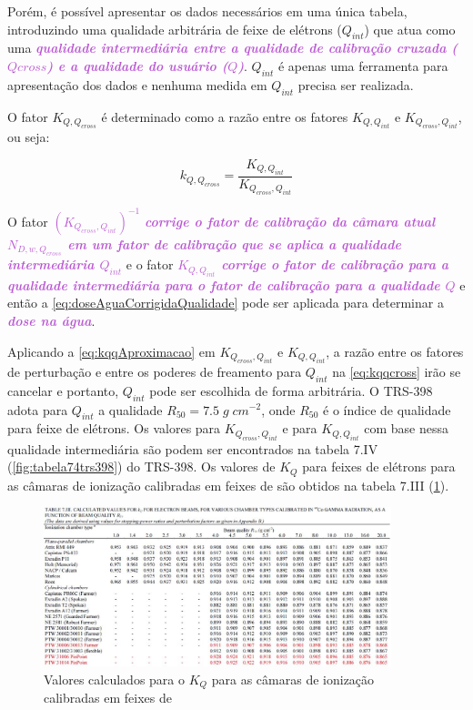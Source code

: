 \documentclass[11pt,a4paper]{article}
\begin{document}
		Porém, é possível apresentar os dados necessários em uma única tabela, introduzindo uma qualidade arbitrária de feixe de elétrons ($Q_{int}$) que atua como uma \textcolor{MediumOrchid}{\textit{\textbf{qualidade intermediária entre a qualidade de calibração cruzada ($Q{cross}$) e a qualidade do usuário ($Q$)}}}. $Q_{int}$ é apenas uma ferramenta para apresentação dos dados e nenhuma medida em $Q_{int}$ precisa ser realizada. 

		O fator $K_{Q,Q_{cross}}$ é determinado como a razão entre os fatores $K_{Q,Q_{int}}$ e $K_{Q_{cross},Q_{int}}$, ou seja:

			\begin{equation}
				k_{Q,Q_{cross}} = \frac{K_{Q,Q_{int}}}{K_{Q_{cross},Q_{int}}}
				\label{eq:kqqcross}
			\end{equation}

		O fator \textcolor{MediumOrchid}{\textit{\textbf{$(K_{Q_{cross},Q_{int}})^{-1}$}}} \textcolor{MediumOrchid}{\textit{\textbf{corrige o fator de calibração da câmara atual $N_{D,w,Q_{cross}}$ em um fator de calibração que se aplica a qualidade intermediária $Q_{int}$}}} e o fator \textcolor{MediumOrchid}{\textit{\textbf{$K_{Q,Q_{int}}$ corrige o fator de calibração para a qualidade intermediária para o fator de calibração para a qualidade $Q$}}} e então a  \ref{eq:doseAguaCorrigidaQualidade} pode ser aplicada para determinar a \textcolor{MediumOrchid}{\textit{\textbf{dose na água}}}.

		Aplicando a \ref{eq:kqqAproximacao} em  $K_{Q_{cross},Q_{int}}$ e $K_{Q,Q_{int}}$, a razão entre os fatores de perturbação e entre os poderes de freamento para $Q_{int}$ na \ref{eq:kqqcross} irão se cancelar e portanto, $Q_{int}$ pode ser escolhida de forma arbitrária. O TRS-398 adota para $Q_{int}$ a qualidade $R_{50} = 7.5 \; g \; cm^{-2}$, onde $R_{50}$ é o índice de qualidade para feixe de elétrons. Os valores para $K_{Q_{cross},Q_{int}}$ e para  $K_{Q,Q_{int}}$ com base nessa qualidade intermediária são podem ser encontrados na tabela 7.IV (\ref{fig:tabela74trs398}) do TRS-398. Os valores de $K_Q$ para feixes de elétrons para as câmaras de ionização calibradas em feixes de  são obtidos na tabela 7.III (\ref{fig:tabela73trs398}).

		\begin{figure}[h]
			\centering
			\includegraphics[width=0.9\textwidth]{Imagens/tabela73trs398.JPG}
			\caption{Valores calculados para o $K_Q$ para as câmaras de ionização calibradas em feixes de  }
			\label{fig:tabela73trs398}
		\end{figure}
\end{document}
